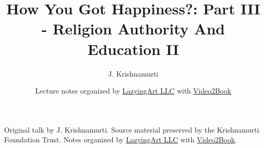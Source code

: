 \documentclass[11pt,oneside]{book}
\begin{document}
\frontmatter
\title{How You Got Happiness?: Part III - Religion Authority And Education II}
\author{J. Krishnamurti}
\date{Lecture notes organized by \href{https://lazying.art}{LazyingArt LLC} with \href{https://github.com/lachlanchen/Video2Book}{Video2Book}}
\maketitle
\begin{center}
\small Original talk by J. Krishnamurti. Source material preserved by the Krishnamurti Foundation Trust. Notes organized by \href{https://lazying.art}{LazyingArt LLC} with \href{https://github.com/lachlanchen/Video2Book}{Video2Book}.
\end{center}
\clearpage
\mainmatter

\end{document}
